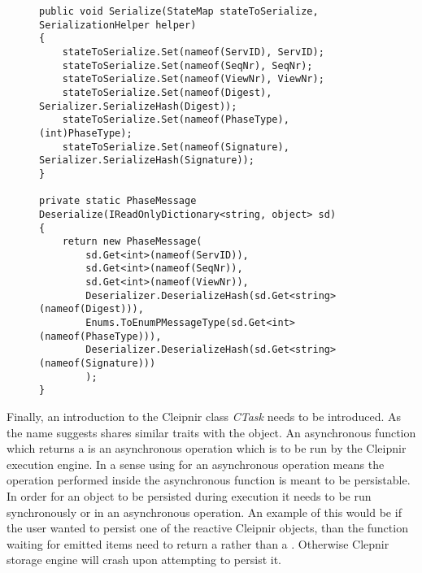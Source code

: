 \begin{figure}[H]
	\centering
	\begin{lstlisting}[label = code:seriadeseria, caption=Serialize/Deserialize code example, captionpos=b, basicstyle=\scriptsize]
public void Serialize(StateMap stateToSerialize, SerializationHelper helper)
{
    stateToSerialize.Set(nameof(ServID), ServID);
    stateToSerialize.Set(nameof(SeqNr), SeqNr);
    stateToSerialize.Set(nameof(ViewNr), ViewNr);
    stateToSerialize.Set(nameof(Digest), Serializer.SerializeHash(Digest));
    stateToSerialize.Set(nameof(PhaseType), (int)PhaseType);
    stateToSerialize.Set(nameof(Signature), Serializer.SerializeHash(Signature));
}

private static PhaseMessage Deserialize(IReadOnlyDictionary<string, object> sd)
{
    return new PhaseMessage(
        sd.Get<int>(nameof(ServID)),
        sd.Get<int>(nameof(SeqNr)),
        sd.Get<int>(nameof(ViewNr)),
        Deserializer.DeserializeHash(sd.Get<string>(nameof(Digest))),
        Enums.ToEnumPMessageType(sd.Get<int>(nameof(PhaseType))),
        Deserializer.DeserializeHash(sd.Get<string>(nameof(Signature)))
        );
}
	\end{lstlisting}
\end{figure}
Finally, an introduction to the Cleipnir class \emph{CTask} needs to be introduced. As the name suggests  shares similar traits with the  object. An asynchronous function which returns a  is an asynchronous operation which is to be run by the Cleipnir execution engine. In a sense using  for an asynchronous operation means the operation performed inside the asynchronous function is meant to be persistable. In order for an object to be persisted during execution it needs to be run synchronously or in an asynchronous  operation. An example of this would be if the user wanted to persist one of the reactive Cleipnir  objects, than the function waiting for emitted items need to return a  rather than a . Otherwise Clepnir storage engine will crash upon attempting to persist it. 

